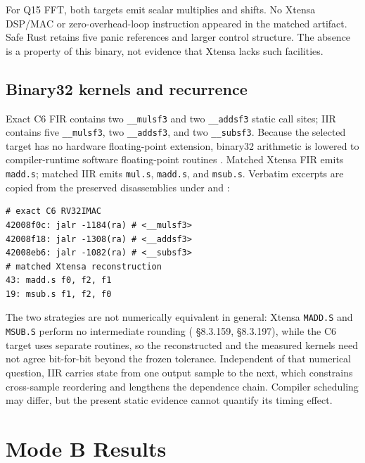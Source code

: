 \documentclass[10pt]{article}
\begin{document}
For Q15 FFT, both targets emit scalar multiplies and shifts. No Xtensa DSP/MAC or zero-overhead-loop instruction appeared in the matched artifact. Safe Rust retains five panic references and larger control structure. The absence is a property of this binary, not evidence that Xtensa lacks such facilities.

\newpage
\subsection{Binary32 kernels and recurrence}
Exact C6 FIR contains two \texttt{\_\_mulsf3} and two \texttt{\_\_addsf3} static call sites; IIR contains five \texttt{\_\_mulsf3}, two \texttt{\_\_addsf3}, and two \texttt{\_\_subsf3}. Because the selected target has no hardware floating-point extension, binary32 arithmetic is lowered to compiler-runtime software floating-point routines \citep{gccSoftFloat1420}. Matched Xtensa FIR emits \texttt{madd.s}; matched IIR emits \texttt{mul.s}, \texttt{madd.s}, and \texttt{msub.s}. Verbatim excerpts are copied from the preserved disassemblies under  and :
\begin{lstlisting}[caption={Floating-point lowering, copied from the preserved disassemblies under \texttt{artifacts/builds/} and \texttt{artifacts/static/}. Call-site counts are static; reconstructed Xtensa code was not timed.}]
# exact C6 RV32IMAC
42008f0c: jalr -1184(ra) # <__mulsf3>
42008f18: jalr -1308(ra) # <__addsf3>
42008eb6: jalr -1082(ra) # <__subsf3>
# matched Xtensa reconstruction
43: madd.s f0, f2, f1
19: msub.s f1, f2, f0
\end{lstlisting}
The two strategies are not numerically equivalent in general: Xtensa \texttt{MADD.S} and \texttt{MSUB.S} perform no intermediate rounding (\citealp{cadenceXtensaISASummary} \S8.3.159, \S8.3.197), while the C6 target uses separate routines, so the reconstructed and the measured kernels need not agree bit-for-bit beyond the frozen tolerance. Independent of that numerical question, IIR carries state from one output sample to the next, which constrains cross-sample reordering and lengthens the dependence chain. Compiler scheduling may differ, but the present static evidence cannot quantify its timing effect.

\section{Mode B Results}
\begin{table}[!htbp]
\centering\small
\caption{Selected largest-input Mode B observations. Each B/A ratio uses that language's own Mode A median.}
\label{tab:modeb}

\end{table}
\end{document}
